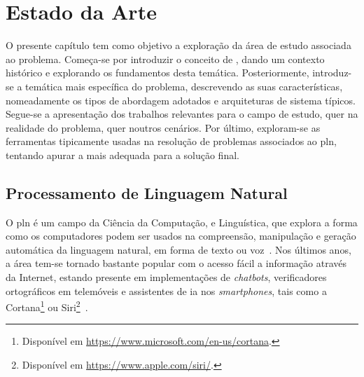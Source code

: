\chapter{Estado da Arte}
\label{chap:Chapter3}
O presente capítulo tem como objetivo a exploração da área de estudo associada ao problema. Começa-se por introduzir o conceito de , dando um contexto histórico e explorando os fundamentos desta temática. Posteriormente, introduz-se a temática mais específica do problema, descrevendo as suas características, nomeadamente os tipos de abordagem adotados e arquiteturas de sistema típicos. Segue-se a apresentação dos trabalhos relevantes para o campo de estudo, quer na realidade do problema, quer noutros cenários. Por último, exploram-se as ferramentas tipicamente usadas na resolução de problemas associados ao \gls{pln}, tentando apurar a mais adequada para a solução final.

\section{Processamento de Linguagem Natural}
\label{sec:chap03_pln}
O \gls{pln} é um campo da Ciência da Computação,  e Linguística, que explora a forma como os computadores podem ser usados na compreensão, manipulação e geração automática da linguagem natural, em forma de texto ou voz~\parencite{nlp, applied_natural_language_processing_with_python, pln_extracao_conhecimento}. Nos últimos anos, a área tem-se tornado bastante popular com o acesso fácil a informação através da Internet, estando presente em implementações de \textit{chatbots}, verificadores ortográficos em telemóveis e assistentes de \gls{ia} nos \textit{smartphones}, tais como a Cortana\footnote{Disponível em \url{https://www.microsoft.com/en-us/cortana}.} ou Siri\footnote{Disponível em \url{https://www.apple.com/siri/}.}~\parencite{pln_extracao_conhecimento, applied_natural_language_processing_with_python}. 

